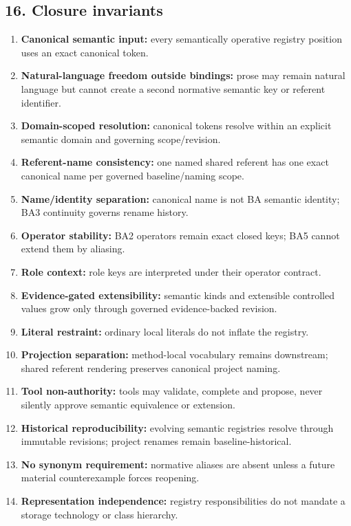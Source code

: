 \documentclass[
  10pt,
  a4paper,
]{article}
\providecommand{\tightlist}{%
  \setlength{\itemsep}{0pt}\setlength{\parskip}{0pt}}
\begin{document}
\subsection{16. Closure invariants}\label{16-closure-invariants}

\begin{enumerate}
\def\labelenumi{\arabic{enumi}.}
\tightlist
\item
  \textbf{Canonical semantic input:} every semantically operative
  registry position uses an exact canonical token.
\item
  \textbf{Natural-language freedom outside bindings:} prose may remain
  natural language but cannot create a second normative semantic key or
  referent identifier.
\item
  \textbf{Domain-scoped resolution:} canonical tokens resolve within an
  explicit semantic domain and governing scope/revision.
\item
  \textbf{Referent-name consistency:} one named shared referent has one
  exact canonical name per governed baseline/naming scope.
\item
  \textbf{Name/identity separation:} canonical name is not BA semantic
  identity; BA3 continuity governs rename history.
\item
  \textbf{Operator stability:} BA2 operators remain exact closed keys;
  BA5 cannot extend them by aliasing.
\item
  \textbf{Role context:} role keys are interpreted under their operator
  contract.
\item
  \textbf{Evidence-gated extensibility:} semantic kinds and extensible
  controlled values grow only through governed evidence-backed revision.
\item
  \textbf{Literal restraint:} ordinary local literals do not inflate the
  registry.
\item
  \textbf{Projection separation:} method-local vocabulary remains
  downstream; shared referent rendering preserves canonical project
  naming.
\item
  \textbf{Tool non-authority:} tools may validate, complete and propose,
  never silently approve semantic equivalence or extension.
\item
  \textbf{Historical reproducibility:} evolving semantic registries
  resolve through immutable revisions; project renames remain
  baseline-historical.
\item
  \textbf{No synonym requirement:} normative aliases are absent unless a
  future material counterexample forces reopening.
\item
  \textbf{Representation independence:} registry responsibilities do not
  mandate a storage technology or class hierarchy.
\end{enumerate}
\end{document}
